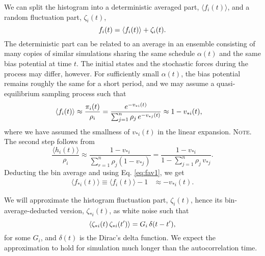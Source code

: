 \documentclass[reprint, superscriptaddress, floatfix]{revtex4-1}
\newcommand{\note}[1]{{\color{DarkGreen}\footnotesize \textsc{Note.} #1}}
\begin{document}
We can split the histogram into
a deterministic averaged part, $\langle f_i(t) \rangle$,
and a random fluctuation part, $\zeta_i(t)$,
%
\begin{equation}
  f_i(t) =
  \langle f_i(t) \rangle
  +
  \zeta_i(t)
  .
  \notag
\end{equation}
%
The deterministic part can be related
to an average in an ensemble consisting of
many copies of similar simulations
sharing the same schedule $\alpha(t)$
and the same bias potential at time $t$.
%
The initial states and the stochastic forces
during the process may differ, however.
%
For sufficiently small $\alpha(t)$,
the bias potential remains roughly the same for a short period,
and we may assume a quasi-equilibrium sampling process
such that
%
\begin{align}
  \langle f_i(t) \rangle
  &\approx
  \frac{ \pi_i(t) } { \rho_i }
  =
  \frac{                          e^{-v_{*i}(t)} }
       { \sum_{j = 1}^n \rho_j \, e^{-v_{*j}(t)} }
  \approx
  1 - v_{*i}(t)
  ,
  \notag
\end{align}
%
where we have assumed the smallness
of $v_{*i}(t)$ in the linear expansion.
%
\note{
The second step follows from
$$
\frac{ \langle h_i(t) \rangle }
     { \rho_i }
\approx
\frac{                       1 - v_{*i}  }
     { \sum_{ r = 1 }^n \rho_j (1 - v_{*j}) }
=
\frac{                       1 - v_{*i}  }
     { 1 - \sum_{ j = 1 }^n \rho_j \, v_{*j} }
.
$$
}%
%
Deducting the bin average and using Eq. \eqref{eq:fav1}, we get
%
\begin{align}
  \langle f_{*i}(t) \rangle
  \equiv
  \langle f_i(t) \rangle - 1
  &\approx
  - v_{*i}(t)
  .
  \label{eq:sh_ave}
\end{align}


We will approximate the histogram fluctuation part, $\zeta_i(t)$,
hence its bin-average-deducted version, $\zeta_{*i}(t)$,
as white noise such that
\begin{equation}
  \langle \zeta_{*i}(t) \, \zeta_{*i}(t') \rangle
  = G_i \, \delta(t - t')
  ,
  \notag
\end{equation}
for some $G_i$,
and $\delta(t)$ is the Dirac's delta function.
%
We expect the approximation to hold for simulation
much longer than the autocorrelation time.
%
\end{document}
